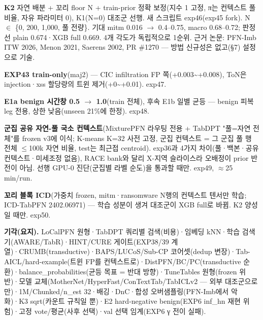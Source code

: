 \par\noindent \textbullet\enspace \textbf{K2} 자연 배분 +\allowbreak{} 꼬리 floor N +\allowbreak{} train-prior 정확 보정(지수 1 고정, π는 컨텍스트 풀 비율, 자유 파라미터 0), K1(N=\allowbreak{}0) 대조군 선행. 새 스크립트 exp46(exp45 fork). N \ensuremath{\in} \{0, 200, 1,000, 풀 전량\}. 기대 mitm 0.016 \ensuremath{\rightarrow} 0.4–0.75, macro 0.68–0.72; 판정선 plain 0.674·XGB full 0.669. 4개 각도가 독립적으로 1순위. 근거 논문: PFN-Imb ITW 2026, Menon 2021, Saerens 2002, PR \#1270 — 방법 신규성은 없고(§7) 설정으로 기술.


\par\noindent \textbullet\enspace \textbf{EXP43 train-only}(maj2) — CIC infiltration FP 쪽(+\allowbreak{}0.003\textasciitilde{}+\allowbreak{}0.008), ToN은 injection·xss 할당량의 트윈 제거(+\allowbreak{}0\textasciitilde{}+\allowbreak{}0.01). exp47.


\par\noindent \textbullet\enspace \textbf{E1a benign 시간창 0.5 \ensuremath{\rightarrow} 1.0}(train 전체), 후속 E1b 일별 균등 — benign 피복 leg 전용, 상한 낮음(unseen 21\%에 한정). exp48.


\par\noindent \textbullet\enspace \textbf{군집 공유 자연-풀 국소 컨텍스트}(MixturePFN 라우팅 전용 +\allowbreak{} TabDPT "풀=\allowbreak{}자연 전체"를 frozen v3에 이식; K-means K=\allowbreak{}32 사전 고정, 군집 컨텍스트 =\allowbreak{} 그 군집 풀 행 전체 \ensuremath{\leq}100k 자연 비율, test는 최근접 centroid). exp36과 4가지 차이(풀·백본·공유 컨텍스트·미세조정 없음), RACE bank와 달리 X-지역 슬라이스라 오배정이 prior 반전이 아님. 선행 GPU-0 진단(군집별 라벨 순도)을 통과할 때만. exp49, \ensuremath{\approx}25 min/\allowbreak{}run.


\par\noindent \textbullet\enspace \textbf{꼬리 블록 ICD}(가중치 frozen, mitm·ransomware N행의 컨텍스트 텐서만 학습; ICD-TabPFN 2402.06971) — 학습 성분이 생겨 대조군이 XGB full로 바뀜. K2 양성일 때만. exp50.


\textbf{기각(요지).} LoCalPFN 원형·TabDPT 쿼리별 검색(비용)·임베딩 kNN·학습 검색기(AWARE/\allowbreak{}TabR)·HINT/\allowbreak{}CURE 게이트(EXP38/\allowbreak{}39 계열)·CRUMB(transductive)·BAPS/\allowbreak{}LUCoS/\allowbreak{}Sub-CP 코어셋(dedup 변장)·Tab-AICL/\allowbreak{}hard-example(트윈 FP를 컨텍스트로)·DistPFN/\allowbreak{}BC/\allowbreak{}PC(transductive 순환)·balance\_\allowbreak{}probabilities(균등 목표 =\allowbreak{} 반대 방향)·TuneTables 원형(frozen 위반)·모델 교체(MotherNet/\allowbreak{}HyperFast/\allowbreak{}ConTextTab/\allowbreak{}TabICLv2 — 외부 대조군으로만)·1M/\allowbreak{}Chunked/\allowbreak{}n\_\allowbreak{}est 32·배깅·DnC·합성 오버샘플링(PFN-Imb에서 악화)·K3 sqrt(카운트 규칙일 뿐)·E2 hard-negative benign(EXP6 inf\_\allowbreak{}hn 재현 위험)·고정 vote/\allowbreak{}평균(사후 선택)·val 선택 임계(EXP6 γ 전이 실패).

